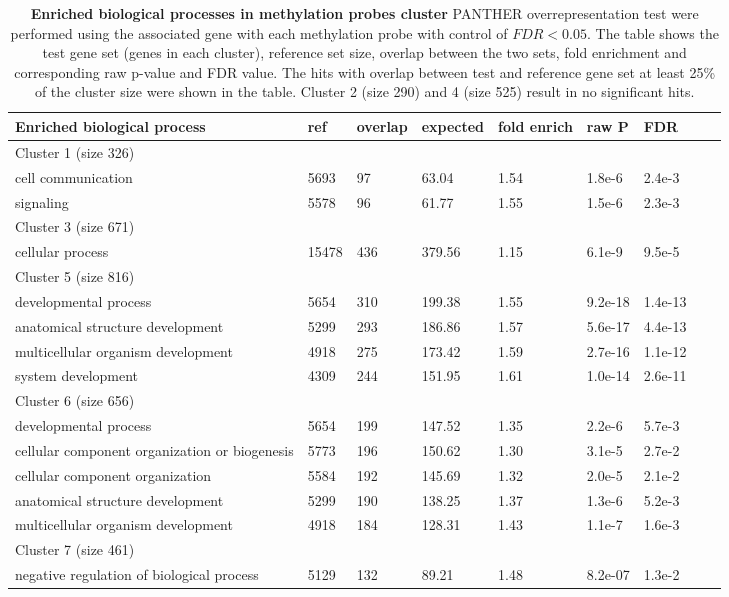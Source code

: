 \documentclass{article}
\begin{document}
\begin{table*}[ht!]
\centering
\begin{tabular}{lllllllll}
  \toprule
Enriched biological process & ref & overlap & expected & fold enrich & raw P & FDR \\ 
  \midrule
  Cluster 1 (size 326) \\
  \midrule
  cell communication & 5693 &  97 & 63.04 & 1.54 & 1.8e-6 & 2.4e-3 \\ 
  signaling & 5578 &  96 & 61.77 & 1.55 & 1.5e-6 & 2.3e-3 \\ 
   \midrule
   Cluster 3 (size 671) \\
   \midrule
     cellular process & 15478 & 436 & 379.56 & 1.15 & 6.1e-9 & 9.5e-5 \\ 
\midrule
  Cluster 5 (size 816)\\
  \midrule
  developmental process  & 5654 & 310 & 199.38 & 1.55 & 9.2e-18 & 1.4e-13 \\ 
  anatomical structure development & 5299 & 293 & 186.86 & 1.57 & 5.6e-17 & 4.4e-13 \\ 
  multicellular organism development & 4918 & 275 & 173.42 & 1.59 & 2.7e-16 & 1.1e-12 \\ 
  system development & 4309 & 244 & 151.95 & 1.61 & 1.0e-14 & 2.6e-11 \\ 
     \midrule
   Cluster 6 (size 656)\\
  \midrule
  developmental process & 5654 & 199 & 147.52 & 1.35 & 2.2e-6 & 5.7e-3 \\ 
  cellular component organization or biogenesis & 5773 & 196 & 150.62 & 1.30 & 3.1e-5 & 2.7e-2 \\ 
  cellular component organization & 5584 & 192 & 145.69 & 1.32 & 2.0e-5 & 2.1e-2 \\ 
  anatomical structure development & 5299 & 190 & 138.25 & 1.37 & 1.3e-6 & 5.2e-3 \\ 
  multicellular organism development & 4918 & 184 & 128.31 & 1.43 & 1.1e-7 & 1.6e-3 \\ 
     \midrule
     Cluster 7 (size 461) \\
     \midrule
     negative regulation of biological process & 5129 & 132 & 89.21 & 1.48 & 8.2e-07 & 1.3e-2 \\ 
	\bottomrule
\end{tabular}
\caption{\textbf{Enriched biological processes in \citet{figueroa2010dna} methylation probes cluster} PANTHER overrepresentation test were performed using the associated gene with each methylation probe with control of $FDR < 0.05$. The table shows the test gene set (genes in each cluster), reference set size, overlap between the two sets, fold enrichment and corresponding raw p-value and FDR value. The hits with overlap between test and reference gene set at least 25\% of the cluster size were shown in the table. Cluster 2 (size 290) and 4 (size 525) result in no significant hits.}
\label{enriched}
\end{table*}
\end{document}
